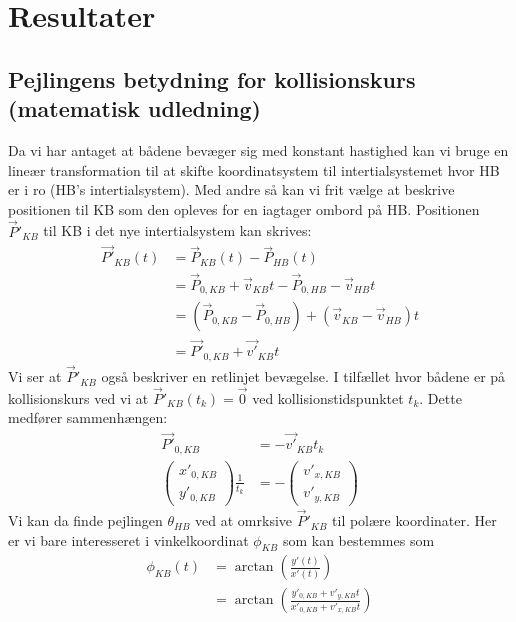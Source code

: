\documentclass[%
 reprint,
nofootinbib,
aps,
]{revtex4-1}
\begin{document}
\section{Resultater}

\subsection{Pejlingens betydning for kollisionskurs (matematisk udledning)}\label{sec:pejling_betydning}
Da vi har antaget at bådene bevæger sig med konstant hastighed kan vi bruge en lineær transformation til at skifte koordinatsystem til intertialsystemet hvor HB er i ro (HB's intertialsystem). Med andre så kan vi frit vælge at beskrive positionen til KB som den opleves for en iagtager ombord på HB. Positionen $\vec{P}'_{KB}$ til KB i det nye intertialsystem kan skrives:
\begin{align*}
  \vec{P'}_{KB}(t) &= \vec{P}_{KB}(t) - \vec{P}_{HB}(t) \\
  &= \vec{P}_{0,KB} + \vec{v}_{KB}t - \vec{P}_{0,HB} - \vec{v}_{HB}t \\
  &= (\vec{P}_{0,KB} - \vec{P}_{0,HB}) + (\vec{v}_{KB} - \vec{v}_{HB})t \\
  &= \vec{P'}_{0,KB} + \vec{v'}_{KB}t
\end{align*}
Vi ser at $\vec{P}'_{KB}$ også beskriver en retlinjet bevægelse. I tilfællet hvor bådene er på kollisionskurs ved vi at $\vec{P}'_{KB}(t_k) = \vec{0}$ ved kollisionstidspunktet $t_{k}$. Dette medfører sammenhængen:
\begin{align}
  \vec{P'}_{0,KB} &= - \vec{v'}_{KB}t_k \nonumber \\
  \begin{pmatrix} x'_{0,KB} \\ y'_{0,KB} \end{pmatrix}\frac{1}{t_k} &=   -\begin{pmatrix} v'_{x,KB} \\ v'_{y,KB} \end{pmatrix}
  \label{eq:P=v}
\end{align}
Vi kan da finde pejlingen $\theta_{HB}$ ved at omrksive $\vec{P}'_{KB}$ til polære koordinater. Her er vi bare interesseret i vinkelkoordinat $\phi_{KB}$ som kan bestemmes som
\begin{align*}
  \phi_{KB}(t) &= \arctan{\left( \frac{y'(t)}{x'(t)}\right)} \\
  &= \arctan{\left( \frac{y'_{0,KB} + v'_{y,KB}t}{x'_{0,KB} + v'_{x,KB}t}\right)}
\end{align*}
\end{document}
